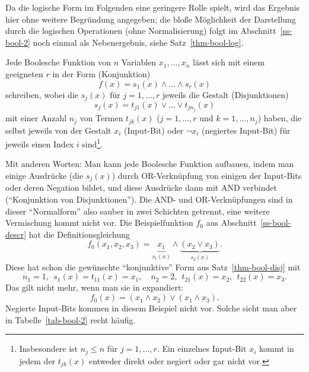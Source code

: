 \begin{refsegment}
Da die logische Form im Folgenden eine geringere Rolle spielt, wird
das Ergebnis hier ohne weitere Begründung angegeben; die bloße Möglichkeit
der Darstellung durch die logischen Operationen (ohne Normalisierung)
folgt im Abschnitt~\ref{ss-bool-2} noch einmal als Nebenergebnis,
siehe Satz~\ref{thm-bool-log}.

\begin{satz}\label{thm-bool-disj}
   Jede Boolesche Funktion von $n$ Variablen $x_1, \ldots, x_n$ lässt
   sich mit einem geeigneten $r$ in der Form (Konjunktion)
\[
     f(x) = s_1(x) \wedge \ldots \wedge s_r(x)
\]
   schreiben, wobei die $s_j(x)$ für $j = 1, \ldots, r$ jeweils die
   Gestalt (Disjunktionen)
\[
     s_j(x) = t_{j1}(x) \vee \ldots \vee t_{jn_j}(x)
\]
   mit einer Anzahl $n_j$ von Termen $t_{jk}(x)$ ($j = 1, \ldots, r$
   und $k = 1, \ldots, n_j$) haben, die selbst jeweils
   von der Gestalt $x_i$ (Input-Bit) oder
   $\neg x_i$ (negiertes Input-Bit) für jeweils einen Index $i$
   sind\footnote{%
   Insbesondere ist $n_j \leq n$ für $j = 1, \ldots,r$.
   Ein einzelnes Input-Bit $x_i$ kommt in jedem der $t_{jk}(x)$
   entweder direkt oder negiert oder gar nicht vor.}.
\end{satz}
Mit anderen Worten: Man kann jede Boolesche
Funktion aufbauen, indem
man einige Ausdrücke (die $s_j(x)$) durch OR-Verknüpfung von einigen der
Input-Bits oder deren Negation bildet, und diese Ausdrücke dann
mit AND verbindet ("`Konjunktion von Disjunktionen"'). Die AND- und
OR-Verknüpfungen sind in dieser "`Normalform"' also sauber
in zwei Schichten getrennt, eine weitere Vermischung kommt nicht vor.
Die Beispielfunktion $f_0$ aus Abschnitt~\ref{ss-bool-descr} hat
die Definitionsgleichung
\[
     f_0(x_1,x_2,x_3)
     = \underbrace{x_1}_{s_1(x)}
     \wedge \underbrace{(x_2 \vee x_3)}_{s_2(x)}.
\]
Diese hat schon die gewünschte "`konjunktive"' Form aus
Satz~\ref{thm-bool-disj} mit
\[
     n_1 = 1, \:\: s_1(x) = t_{11}(x) = x_1, \quad
     n_2 = 2, \:\: t_{21}(x) = x_2, \:\: t_{22}(x) = x_3.
\]
Das gilt nicht mehr, wenn man sie in expandiert:
\[
     f_0(x) = (x_1 \wedge x_2) \vee (x_1 \wedge x_3).
\]
Negierte Input-Bits kommen in diesem Beispiel nicht vor. Solche sieht
man aber in Tabelle~\ref{tab-bool-2} recht häufig.


\end{refsegment}
